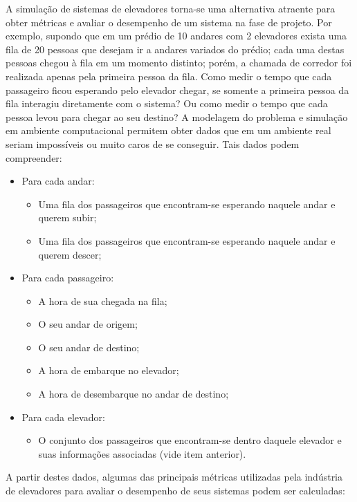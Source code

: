 A simulação de sistemas de elevadores torna-se uma alternativa atraente para
obter métricas e avaliar o desempenho de um sistema na fase de projeto. Por
exemplo, supondo que em um prédio de 10 andares com 2 elevadores exista uma fila
de 20 pessoas que desejam ir a andares variados do prédio; cada uma destas
pessoas chegou à fila em um momento distinto; porém, a chamada de corredor foi
realizada apenas pela primeira pessoa da fila. Como medir o tempo que cada
passageiro ficou esperando pelo elevador chegar, se somente a primeira
pessoa da fila interagiu diretamente com o sistema? Ou como medir o tempo que
cada pessoa levou para chegar ao seu destino? A modelagem do problema e
simulação em ambiente computacional permitem obter dados que em um ambiente real
seriam impossíveis ou muito caros de se conseguir. Tais dados podem compreender:

\begin{itemize}
  \item Para cada andar:
  \begin{itemize}
    \item Uma fila dos passageiros que encontram-se esperando naquele andar e querem subir;
    \item Uma fila dos passageiros que encontram-se esperando naquele andar e querem descer;
  \end{itemize}
  \item Para cada passageiro:
  \begin{itemize}
    \item A hora de sua chegada na fila;
    \item O seu andar de origem;
    \item O seu andar de destino;
    \item A hora de embarque no elevador;
    \item A hora de desembarque no andar de destino;
  \end{itemize}
  \item Para cada elevador:
  \begin{itemize}
    \item O conjunto dos passageiros que encontram-se dentro daquele elevador e suas informações associadas (vide item anterior).
  \end{itemize}
\end{itemize}

A partir destes dados, algumas das principais métricas utilizadas pela indústria
de elevadores para avaliar o desempenho de seus sistemas podem ser calculadas:

